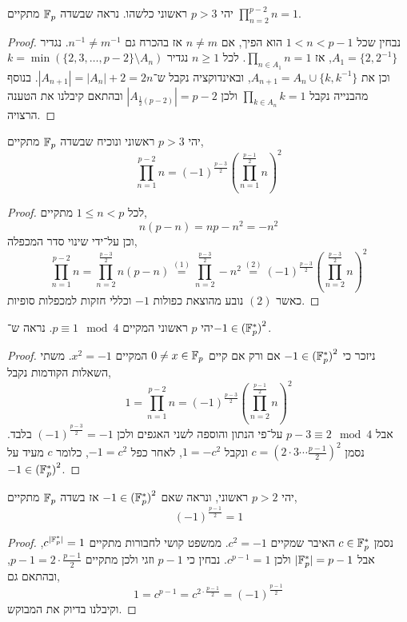 \question{}
יהי $p > 3$ ראשוני כלשהו.
נראה שבשדה $\mathbb{F}_p$ מתקיים $\prod_{n = 2}^{p - 2} n = 1$.
\begin{proof}
	נבחין שכל $1 < n < p - 1$ הוא הפיך, אם $n \ne m$ אז בהכרח גם $n^{-1} \ne m^{-1}$.
	נגדיר $A_1 = \{2, 2^{-1}\}$, אז $\prod_{n \in A_1} n = 1$.
	לכל $n \ge 1$ נגדיר $k = \min(\{2, 3, \ldots, p - 2\} \setminus A_n)$ וכן את $A_{n + 1} = A_n \cup \{ k, k^{-1} \}$, ובאינדוקציה נקבל ש־$|A_{n + 1}| = |A_n| + 2 = 2n$.
	בנוסף מהבנייה נקבל $\prod_{k \in A_n} k = 1$ ולכן $|A_{\frac{1}{2}(p - 2)}| = p - 2$ ובהתאם קיבלנו את הטענה הרצויה.
\end{proof}

\question{}
יהי $p > 3$ ראשוני ונוכיח שבשדה $\mathbb{F}_p$ מתקיים,
\[
	\prod_{n = 1}^{p - 2} n
	= {(-1)}^{\frac{p - 3}{2}} {\left( \prod_{n = 1}^{\frac{p - 1}{2}} n \right)}^2
\]
\begin{proof}
	לכל $1 \le n < p$ מתקיים,
	\[
		n (p - n)
		= n p - n^2
		= -n^2
		\tag{1}
	\]
	וכן על־ידי שינוי סדר המכפלה,
	\[
		\prod_{n = 1}^{p - 2} n
		= \prod_{n = 2}^{\frac{p - 3}{2}} n (p - n)
		\overset{(1)}{=} \prod_{n = 2}^{\frac{p - 3}{2}} -n^2
		\overset{(2)}{=} {(-1)}^{\frac{p - 3}{2}} {\left( \prod_{n = 2}^{\frac{p - 3}{2}} n \right)}^2
	\]
	כאשר $(2)$ נובע מהוצאת כפולות $-1$ וכללי חזקות למכפלות סופיות.
\end{proof}

\question{}
יהי $p$ ראשוני המקיים $p \equiv 1 \mod 4$.
נראה ש־$-1 \in {(\mathbb{F}_p^*)}^2$.
\begin{proof}
	ניזכר כי $-1 \in {(\mathbb{F}_p^*)}^2$ אם ורק אם קיים $0 \ne x \in \mathbb{F}_p$ המקיים $x^2 = -1$.
	משתי השאלות הקודמות נקבל,
	\[
		1
		= \prod_{n = 1}^{p - 2} n
		= {(-1)}^{\frac{p - 3}{2}} {\left( \prod_{n = 2}^{\frac{p - 1}{2}} n \right)}^2
	\]
	אבל $p - 3 \equiv 2 \mod 4$ על־פי הנתון והוספה לשני האגפים ולכן ${(-1)}^{\frac{p - 3}{2}} = -1$ בלבד.
	נסמן $c = {(2 \cdot 3 \cdots \frac{p - 1}{2})}^2$ ונקבל $1 = -c^2$, לאחר כפל $-1 = c^2$, כלומר $c$ מעיד על $-1 \in {(\mathbb{F}_p^*)}^2$.
\end{proof}

\question{}
יהי $p > 2$ ראשוני, ונראה שאם $-1 \in {(\mathbb{F}_p^*)}^2$ אז בשדה $\mathbb{F}_p$ מתקיים,
\[
	{(-1)}^{\frac{p - 1}{2}} = 1
\]
\begin{proof}
	נסמן $c \in \mathbb{F}_p^*$ האיבר שמקיים $c^2 = -1$.
	ממשפט קושי לחבורות מתקיים $c^{|\mathbb{F}_p^*|} = 1$, אבל $|\mathbb{F}_p^*| = p - 1$ ולכן $c^{p - 1} = 1$.
	נבחין כי $p - 1$ וזגי ולכן מתקיים $p - 1 = 2 \cdot \frac{p - 1}{2}$, ובהתאם גם,
	\[
		1
		= c^{p - 1}
		= c^{2 \cdot \frac{p - 1}{2}}
		= {(-1)}^{\frac{p - 1}{2}}
	\]
	וקיבלנו בדיוק את המבוקש.
\end{proof}

